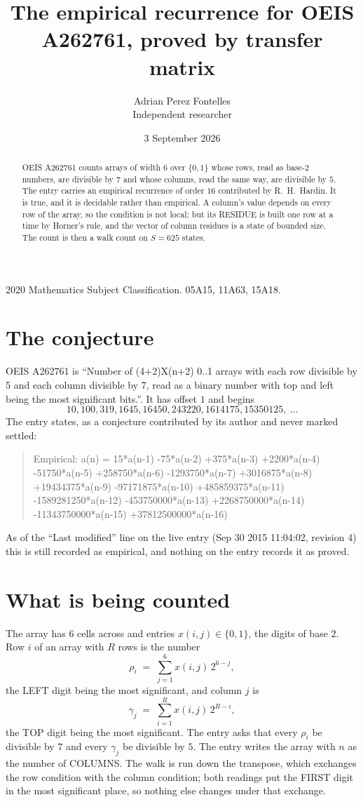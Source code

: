 \documentclass[11pt,a4paper]{article}
\title{The empirical recurrence for OEIS A262761, proved by transfer matrix}
\author{Adrian Perez Fontelles\\ \small Independent researcher}
\date{3 September 2026}
\theoremstyle{plain}
\theoremstyle{definition}
\begin{document}
\maketitle

\begin{abstract}
OEIS A262761 counts arrays of width $6$ over $\{0,1\}$ whose rows, read as base-$2$
numbers, are divisible by $7$ and whose columns, read the same way, are divisible by
$5$. The entry carries an empirical recurrence of order $16$ contributed by
R.~H.~Hardin. It is true, and it is decidable rather than empirical. A column's value depends on
every row of the array, so the condition is not local; but its RESIDUE is built one row at a
time by Horner's rule, and the vector of column residues is a state of bounded size. The count
is then a walk count on $S=625$ states.
\end{abstract}

\noindent\small 2020 Mathematics Subject Classification. 05A15, 11A63, 15A18.\normalsize

\section{The conjecture}

OEIS A262761 is ``Number of (4+2)X(n+2) 0..1 arrays with each row divisible by 5 and each column divisible by 7, read as a binary number with top and left being the most significant bits.''. It has offset $1$ and begins
\[
10, 100, 319, 1645, 16450, 243220, 1614175, 15350125,\ \dots
\]
The entry states, as a conjecture contributed by its author and never marked settled:
\begin{quote}
Empirical: a(n) = 15*a(n-1) -75*a(n-2) +375*a(n-3) +2200*a(n-4) -51750*a(n-5) +258750*a(n-6) -1293750*a(n-7) +3016875*a(n-8) +19434375*a(n-9) -97171875*a(n-10) +485859375*a(n-11) -1589281250*a(n-12) -453750000*a(n-13) +2268750000*a(n-14) -11343750000*a(n-15) +37812500000*a(n-16)
\end{quote}
As of the ``Last modified'' line on the live entry (Sep 30 2015 11:04:02, revision 4) this is still
recorded as empirical, and nothing on the entry records it as proved.

\section{What is being counted}

The array has $6$ cells across and entries $x(i,j)\in\{0,1\}$, the digits of
base $2$. Row $i$ of an array with $R$ rows is the number
\[
\rho_i\;=\;\sum_{j=1}^{6}x(i,j)\,2^{6-j} ,
\]
the LEFT digit being the most significant, and column $j$ is
\[
\gamma_j\;=\;\sum_{i=1}^{R}x(i,j)\,2^{R-i} ,
\]
the TOP digit being the most significant. The entry asks that every $\rho_i$ be divisible by
$7$ and every $\gamma_j$ be divisible by $5$. The entry writes the array with $n$ as the number of COLUMNS. The walk is run down the transpose, which exchanges the row condition with the column condition; both readings put the FIRST digit in the most significant place, so nothing else changes under that exchange.
\end{document}
